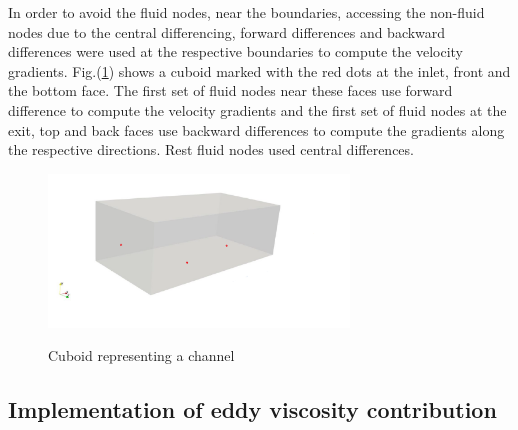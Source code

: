 In order to avoid the fluid nodes, near the boundaries, accessing the non-fluid nodes due to the central differencing, forward differences and backward differences were used at the respective boundaries to compute the velocity gradients. Fig.(\ref{Finite differences bound}) shows a cuboid marked with the red dots at the inlet, front and the bottom face. The first set of fluid nodes near these faces use forward difference to compute the velocity gradients and the first set of fluid nodes at the exit, top and back faces use backward differences to compute the gradients along the respective directions. Rest fluid nodes used central differences.

\begin{figure}[t]
\centering
\includegraphics[width=8cm]{04_Implementation/figur/3D_Domain_gradients.png}
\label{Finite differences bound}
\caption{Cuboid representing a channel}
\end{figure}
\subsection{Implementation of eddy viscosity contribution}

